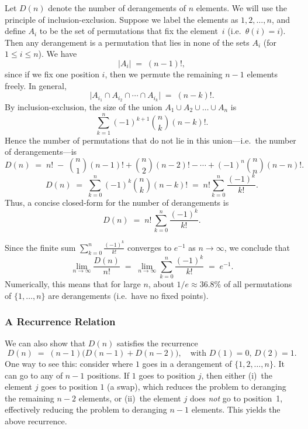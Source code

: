 \documentclass{article}
\begin{document}
Let $D(n)$ denote the number of derangements of $n$ elements. We will use the principle of inclusion-exclusion. Suppose we label the elements as $1,2,\dots,n$, and define $A_i$ to be the set of permutations that fix the element~$i$ (i.e.\ $\theta(i)=i$). Then any derangement is a permutation that lies in none of the sets $A_i$ (for $1 \le i \le n$). We have
\[
\bigl|A_i\bigr| \;=\; (n-1)!,
\]
since if we fix one position $i$, then we permute the remaining $n-1$ elements freely. In general,
\[
\bigl|A_{i_1} \cap A_{i_2} \cap \cdots \cap A_{i_k}\bigr| \;=\; (n-k)!.
\]
By inclusion-exclusion, the size of the union $A_1 \cup A_2 \cup \dots \cup A_n$ is
\[
\sum_{k=1}^{n} (-1)^{k+1} \binom{n}{k} (n-k)!.
\]
Hence the number of permutations that do not lie in this union---i.e.\ the number of derangements---is
\[
D(n) \;=\; n! \;-\; \binom{n}{1}(n-1)! + \binom{n}{2}(n-2)! - \cdots + (-1)^n \binom{n}{n}(n-n)!.
\]
\[
D(n) \;=\; \sum_{k=0}^{n} (-1)^k \binom{n}{k} (n-k)!
\;=\; n! \sum_{k=0}^{n} \frac{(-1)^k}{k!}.
\]
Thus, a concise closed-form for the number of derangements is
\[
D(n) \;=\; n!\,\sum_{k=0}^{n} \frac{(-1)^k}{k!}.
\]

\begin{center}
\end{center}

Since the finite sum \(\sum_{k=0}^{n} \frac{(-1)^k}{k!}\) converges to \(e^{-1}\) as \(n \to \infty\), we conclude that
\[
\lim_{n\to\infty} \frac{D(n)}{n!} 
\;=\; \lim_{n\to\infty} 
\sum_{k=0}^{n} \frac{(-1)^k}{k!}
\;=\;
e^{-1}.
\]
Numerically, this means that for large \(n\), about \(1/e \approx 36.8\%\) of all permutations of \(\{1,\dots,n\}\) are derangements (i.e.\ have no fixed points).


\subsubsection*{A Recurrence Relation}
We can also show that $D(n)$ satisfies the recurrence
\[
D(n) \;=\; (n-1)\bigl(D(n-1) + D(n-2)\bigr),
\quad \text{with } D(1)=0, \,D(2)=1.
\]
One way to see this: consider where $1$ goes in a derangement of $\{1,2,\ldots,n\}$. It can go to any of $n-1$ positions. If $1$ goes to position $j$, then either (i)~the element $j$ goes to position $1$ (a swap), which reduces the problem to deranging the remaining $n-2$ elements, or (ii)~the element $j$ does \emph{not} go to position~1, effectively reducing the problem to deranging $n-1$ elements. This yields the above recurrence.
\end{document}
